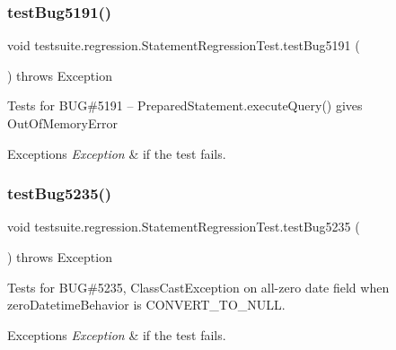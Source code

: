 \subsubsection{\texorpdfstring{test\+Bug5191()}{testBug5191()}}
{\footnotesize\ttfamily void testsuite.\+regression.\+Statement\+Regression\+Test.\+test\+Bug5191 (\begin{DoxyParamCaption}{ }\end{DoxyParamCaption}) throws Exception}

Tests for B\+UG\#5191 -- Prepared\+Statement.\+execute\+Query() gives Out\+Of\+Memory\+Error


\begin{DoxyExceptions}{Exceptions}
{\em Exception} & if the test fails. \\
\hline
\end{DoxyExceptions}
\mbox{\label{classtestsuite_1_1regression_1_1_statement_regression_test_ac43b204c22e7e37fa98b6bd22e3b18fc}} 
\subsubsection{\texorpdfstring{test\+Bug5235()}{testBug5235()}}
{\footnotesize\ttfamily void testsuite.\+regression.\+Statement\+Regression\+Test.\+test\+Bug5235 (\begin{DoxyParamCaption}{ }\end{DoxyParamCaption}) throws Exception}

Tests for B\+UG\#5235, Class\+Cast\+Exception on all-\/zero date field when zero\+Datetime\+Behavior is \textquotesingle{}C\+O\+N\+V\+E\+R\+T\+\_\+\+T\+O\+\_\+\+N\+U\+LL\textquotesingle{}.


\begin{DoxyExceptions}{Exceptions}
{\em Exception} & if the test fails. \\
\hline
\end{DoxyExceptions}
\mbox{\label{classtestsuite_1_1regression_1_1_statement_regression_test_ad893290c719e6320a980acdd172851e7}} 
